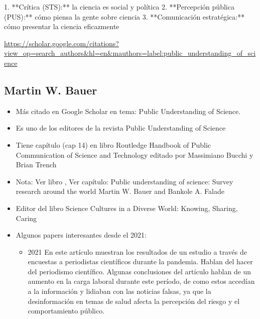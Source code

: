 \documentclass[11pt,                                                            
 superscriptaddress,twoside,
 amsmath,amssymb,
 aps, physrev
]{revtex4-2}
\begin{document}
1. **Crítica (STS):** la ciencia es social y política
2. **Percepción pública (PUS):** cómo piensa la gente sobre ciencia
3. **Comunicación estratégica:** cómo presentar la ciencia eficazmente


\url{https://scholar.google.com/citations?view_op=search_authors&hl=en&mauthors=label:public_understanding_of_science}
\subsection{Martin W. Bauer}
\begin{itemize}
	\item Más citado en Google Scholar en tema: Public Understanding of Science.
	\item Es uno de los editores de la revista Public Understanding of Science
	\item Tiene capítulo (cap 14) en libro Routledge Handbook of Public Communication of Science and Technology editado por Massimiano Bucchi y Brian Trench
	\item Nota: Ver libro \cite{Bucchi2021}, Ver capítulo: Public understanding of science: Survey research around the world Martin W. Bauer and Bankole A. Falade
	\item Editor del libro Science Cultures in a Diverse
	World: Knowing, Sharing, Caring
	\item Algunos papers interesantes desde el 2021:
	
	\begin{itemize}
		\item \cite{Massarani2021} 2021 En este artículo muestran los resultados de un estudio a través de encuestas a periodistas científicos durante la pandemia. Hablan del hacer del periodismo científico. Algunas conclusiones del artículo hablan de un aumento en la carga laboral durante este período, de como estos accedían a la información y lidiaban con las noticias falsas, ya que la desinformación en temas de salud afecta la percepción del riesgo y el comportamiento público.
		

\end{itemize}
\end{itemize}
\end{document}

